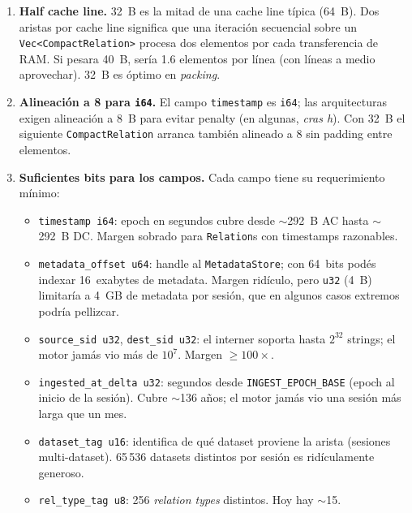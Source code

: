 \begin{enumerate}
    \item \textbf{Half cache line.} 32~B es la mitad de una cache
    line típica (64~B). Dos aristas por cache line significa que
    una iteración secuencial sobre un \texttt{Vec<CompactRelation>}
    procesa dos elementos por cada transferencia de RAM. Si pesara
    40~B, sería 1.6 elementos por línea (con líneas a medio
    aprovechar). 32~B es óptimo en \emph{packing}.
    \item \textbf{Alineación a 8 para \texttt{i64}.} El campo
    \texttt{timestamp} es \texttt{i64}; las arquitecturas exigen
    alineación a 8~B para evitar penalty (en algunas, \emph{cras h}).
    Con 32~B el siguiente \texttt{CompactRelation} arranca también
    alineado a 8 sin padding entre elementos.
    \item \textbf{Suficientes bits para los campos.} Cada campo
    tiene su requerimiento mínimo:
    \begin{itemize}
        \item \texttt{timestamp i64}: epoch en segundos cubre desde
        $\sim$292~B AC hasta $\sim$292~B DC. Margen sobrado para
        \texttt{Relation}s con timestamps razonables.
        \item \texttt{metadata\_offset u64}: handle al
        \texttt{MetadataStore}; con 64~bits podés indexar 16~exabytes
        de metadata. Margen ridículo, pero \texttt{u32} (4~B)
        limitaría a 4~GB de metadata por sesión, que en algunos
        casos extremos podría pellizcar.
        \item \texttt{source\_sid u32}, \texttt{dest\_sid u32}: el
        interner soporta hasta \(2^{32}\) strings; el motor jamás
        vio más de \(10^7\). Margen $\geq 100\times$.
        \item \texttt{ingested\_at\_delta u32}: segundos desde
        \texttt{INGEST\_EPOCH\_BASE} (epoch al inicio de la sesión).
        Cubre $\sim$136 años; el motor jamás vio una sesión más
        larga que un mes.
        \item \texttt{dataset\_tag u16}: identifica de qué dataset
        proviene la arista (sesiones multi-dataset). 65\,536
        datasets distintos por sesión es ridículamente generoso.
        \item \texttt{rel\_type\_tag u8}: 256 \emph{relation types}
        distintos. Hoy hay $\sim$15.
    \end{itemize}
\end{enumerate}

